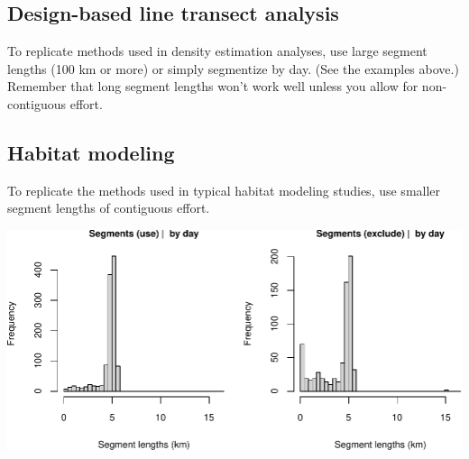 \documentclass[
]{book}
\newenvironment{Shaded}{\begin{snugshade}}{\end{snugshade}}
\newcommand{\AttributeTok}[1]{\textcolor[rgb]{0.77,0.63,0.00}{#1}}
\newcommand{\CommentTok}[1]{\textcolor[rgb]{0.56,0.35,0.01}{\textit{#1}}}
\newcommand{\ConstantTok}[1]{\textcolor[rgb]{0.00,0.00,0.00}{#1}}
\newcommand{\DecValTok}[1]{\textcolor[rgb]{0.00,0.00,0.81}{#1}}
\newcommand{\FunctionTok}[1]{\textcolor[rgb]{0.00,0.00,0.00}{#1}}
\newcommand{\NormalTok}[1]{#1}
\newcommand{\OtherTok}[1]{\textcolor[rgb]{0.56,0.35,0.01}{#1}}
\newcommand{\SpecialCharTok}[1]{\textcolor[rgb]{0.00,0.00,0.00}{#1}}
\newcommand{\StringTok}[1]{\textcolor[rgb]{0.31,0.60,0.02}{#1}}
\begin{document}
\hypertarget{design-based-line-transect-analysis}{%
\subsection*{Design-based line transect analysis}\label{design-based-line-transect-analysis}}

To replicate methods used in density estimation analyses, use large segment lengths (100 km or more) or simply segmentize by day. (See the examples above.) Remember that long segment lengths won't work well unless you allow for non-contiguous effort.

\hypertarget{habitat-modeling}{%
\subsection*{Habitat modeling}\label{habitat-modeling}}

To replicate the methods used in typical habitat modeling studies, use smaller segment lengths of contiguous effort.

\begin{Shaded}
\end{Shaded}

\includegraphics{figures/unnamed-chunk-405-1.pdf}
\end{document}

